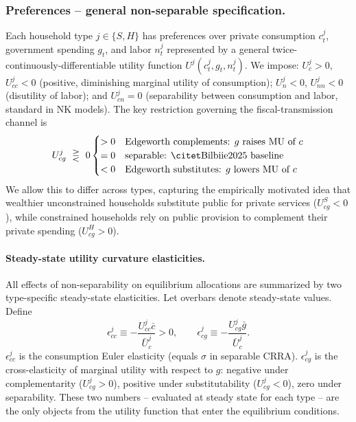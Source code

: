 \subsubsection*{Preferences -- general non-separable specification.}
Each household type $j\in\{S,H\}$ has preferences over private consumption
$c^{j}_{t}$, government spending $g_{t}$, and labor $n^{j}_{t}$ represented by a
general twice-continuously-differentiable utility function
$U^{j}(c^{j}_{t},g_{t},n^{j}_{t})$. We impose: $U^{j}_{c}>0$, $U^{j}_{cc}<0$
(positive, diminishing marginal utility of consumption); $U^{j}_{n}<0$,
$U^{j}_{nn}<0$ (disutility of labor); and $U^{j}_{cn}=0$ (separability between
consumption and labor, standard in NK models). The key restriction governing
the fiscal-transmission channel is
\begin{equation}\label{eq:Ucg-signs}
  U_{cg}^{j}\ \gtreqless\ 0
  \begin{cases}
    >0 & \text{Edgeworth complements: }g\text{ raises MU of }c\\
    =0 & \text{separable: \bilbiie{} baseline}\\
    <0 & \text{Edgeworth substitutes: }g\text{ lowers MU of }c
  \end{cases}
\end{equation}
We allow this to differ across types, capturing the empirically motivated idea
that wealthier unconstrained households substitute public for private services
($U_{cg}^{S}<0$), while constrained households rely on public provision to
complement their private spending ($U_{cg}^{H}>0$).

\paragraph{Steady-state utility curvature elasticities.}
All effects of non-separability on equilibrium allocations are summarized by two
type-specific steady-state elasticities. Let overbars denote steady-state
values. Define
\begin{equation}\label{eq:elasticities}
  \epsilon^{j}_{cc}\equiv-\frac{U^{j}_{cc}\bar c}{\bar U^{j}_{c}}>0,
  \qquad
  \epsilon^{j}_{cg}\equiv-\frac{U^{j}_{cg}\bar g}{\bar U^{j}_{c}}.
\end{equation}
$\epsilon^{j}_{cc}$ is the consumption Euler elasticity (equals $\sigma$ in
separable CRRA). $\epsilon^{j}_{cg}$ is the cross-elasticity of marginal utility
with respect to $g$: negative under complementarity ($U_{cg}^{j}>0$), positive
under substitutability ($U_{cg}^{j}<0$), zero under separability. These two
numbers -- evaluated at steady state for each type -- are the only objects from
the utility function that enter the equilibrium conditions.

